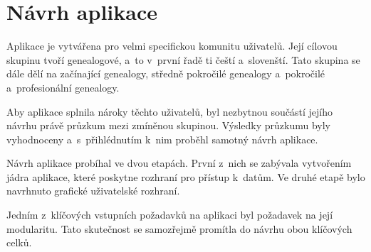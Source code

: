 	
	



\chapter{Návrh aplikace}
\label{chap:design}

Aplikace je vytvářena pro velmi specifickou komunitu uživatelů. Její cílovou skupinu tvoří genealogové, a~to v~první řadě ti čeští a~slovenští. Tato skupina se dále dělí na začínající genealogy, středně pokročilé genealogy a~pokročilé a~profesionální genealogy. \par
Aby aplikace splnila nároky těchto uživatelů, byl nezbytnou součástí jejího návrhu právě průzkum mezi zmíněnou skupinou. Výsledky průzkumu byly vyhodnoceny a~s~přihlédnutím k~nim proběhl samotný návrh aplikace. \par
Návrh aplikace probíhal ve dvou etapách. První z~nich se zabývala vytvořením jádra aplikace, které poskytne rozhraní pro přístup k~datům. Ve druhé etapě bylo navrhnuto grafické uživatelské rozhraní.\par
Jedním z~klíčových vstupních požadavků na aplikaci byl požadavek na její modularitu. Tato skutečnost se samozřejmě promítla do návrhu obou klíčových celků. \par

	

